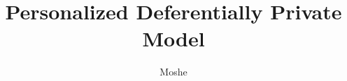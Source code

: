 \documentclass[fourier]{_style/dissertation}
\title[Learn personalized model that predicts \textbf{EMG} Signals while Keeping user's privacy]{Personalized Deferentially Private Model}
\author{Moshe}{Beutel}
\begin{document}
\frontmatter





{
  \cleardoublepage%
  \tableofcontents
}


% 

\mainmatter
% 
% 



\nocite{Abadi2016DeepPrivacy}
\nocite{Rasmussen2006Gaussian2006}
\nocite{HonkelaGaussianPrivacy}
\nocite{Wilson2015DeepLearning}
\nocite{Kaczmarek2019PutEMGADataset}
\nocite{Achituve2021GP-Tree:Learning}
\nocite{Achituve2021PersonalizedProcesses}
\nocite{Dwork2014ThePrivacy}
\printbibliography

% 

\backmatter
% 
% 
% 
% 
\end{document}
